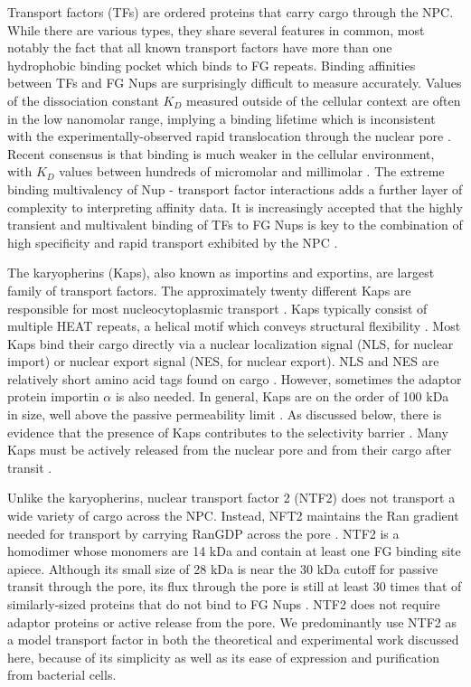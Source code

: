 Transport factors (TFs) are ordered proteins that carry cargo through the NPC.  While there are various types, they share several features in common, most notably the fact that all known transport factors have more than one hydrophobic binding pocket which binds to FG repeats.  Binding affinities between TFs and FG Nups are surprisingly difficult to measure accurately.  Values of the dissociation constant $K_D$ measured outside of the cellular context are often in the low nanomolar range, implying a binding lifetime which is inconsistent with the experimentally-observed rapid translocation through the nuclear pore \cite{pyhtila03, gilchrist02}.  Recent consensus is that binding is much weaker in the cellular environment, with $K_D$ values between hundreds of micromolar and millimolar \cite{tetenbaum-novatt12-1, milles15, hayama18}.  The extreme binding multivalency of Nup - transport factor interactions adds a further layer of complexity to interpreting affinity data.  It is increasingly accepted that the highly transient and multivalent binding of TFs to FG Nups is key to the combination of high specificity and rapid transport exhibited by the NPC \cite{jovanovic-talisman17}.

The karyopherins (Kaps), also known as importins and exportins, are largest family of transport factors.  The approximately twenty different Kaps are responsible for most nucleocytoplasmic transport \cite{kapinos17}. Kaps typically consist of multiple HEAT repeats, a helical motif which conveys structural flexibility \cite{yoshimura16}.  Most Kaps bind their cargo directly via a nuclear localization signal (NLS, for nuclear import) or nuclear export signal (NES, for nuclear export).  NLS and NES are relatively short amino acid tags found on cargo \cite{chook11}.  However, sometimes the adaptor protein importin $\alpha$ is also needed.    In general, Kaps are on the order of 100 kDa in size, well above the passive permeability limit \cite{timney16}.   As discussed below, there is evidence that the presence of Kaps contributes to the selectivity barrier \cite{kapinos18,kapinos17,schleicher14, kapinos14}.  Many Kaps must be actively released from the nuclear pore and from their cargo after transit \cite{gorlich96,stewart07}.


Unlike the karyopherins, nuclear transport factor 2 (NTF2) does not transport a wide variety of cargo across the NPC.  Instead, NFT2 maintains the Ran gradient needed for transport by carrying RanGDP across the pore \cite{ribbeck98,bayliss99}.  NTF2 is a homodimer whose monomers are 14 kDa and contain at least one FG binding site apiece.  Although its small size of 28 kDa is near the 30 kDa cutoff for passive transit through the pore, its flux through the pore is still at least 30 times that of similarly-sized proteins that do not bind to FG Nups \cite{ribbeck01,siebrasse02,kiskin03}.  NTF2 does not require adaptor proteins or active release from the pore. We predominantly use NTF2 as a model transport factor in both the theoretical and experimental work discussed here, because of its simplicity as well as its ease of expression and purification from bacterial cells.

